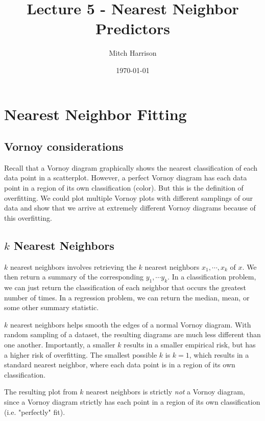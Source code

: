 \documentclass[titlepage, 12pt, leqno]{article}
\title{\Huge{Lecture 5 - Nearest Neighbor Predictors}}
\author{\large{Mitch Harrison}}
\date{\today}
\begin{document}
\setlength{\parskip}{1\baselineskip}
\setlength{\parindent}{15pt}
\maketitle
\tableofcontents
\newpage



\section{Nearest Neighbor Fitting}

\subsection{Vornoy considerations}

Recall that a Vornoy diagram graphically shows the nearest classification of
each data point in a scatterplot. However, a perfect Vornoy diagram has each
data point in a region of its own classification (color). But this is the
definition of overfitting. We could plot multiple Vornoy plots with different
samplings of our data and show that we arrive at extremely different Vornoy 
diagrams because of this overfitting.

\subsection{$k$ Nearest Neighbors}

$k$ nearest neighbors involves retrieving the $k$ nearest neighbors
$x_{1}, \cdots , x_{k}$ of $x$. We then return a summary of the corresponding
$y_{1}, \cdots y_{k}$. In a classification problem, we can just return the 
classification of each neighbor that occurs the greatest number of times. In a
regression problem, we can return the median, mean, or some other summary
statistic.

$k$ nearest neighbors helps smooth the edges of a normal Vornoy diagram. With
random sampling of a dataset, the resulting diagrams are much less different than
one another. Importantly, a smaller $k$ results in a smaller empirical risk, but
has a higher risk of overfitting. The smallest possible $k$ is $k=1$, which 
results in a standard nearest neighbor, where each data point is in a region of
its own classification.

\begin{note}
    The resulting plot from $k$ nearest neighbors is strictly \textit{not} a
    Vornoy diagram, since a Vornoy diagram strictly has each point in a region of
    its own classification (i.e. "perfectly" fit).
\end{note}
\end{document}
